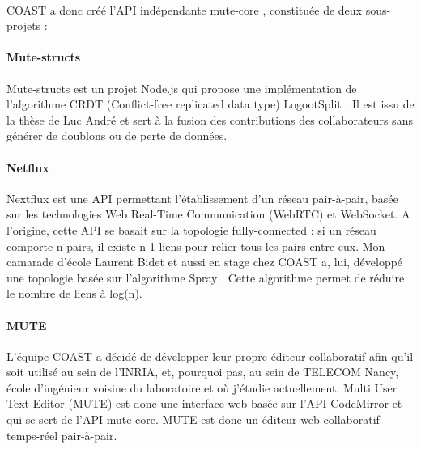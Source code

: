 \documentclass[12pt]{article}
\begin{document}
\paragraph{}
COAST a donc créé l'API indépendante mute-core \cite{mute-core}, constituée de deux sous-projets :

\paragraph{Mute-structs}
Mute-structs \cite{mute-structs} est un projet Node.js qui propose une implémentation de l'algorithme CRDT (Conflict-free replicated data type) LogootSplit \cite{logoot}. Il est issu de la thèse de Luc André et sert à la fusion des contributions des collaborateurs sans générer de doublons ou de perte de données.

\paragraph{Netflux}
Nextflux \cite{netflux} est une API permettant l'établissement d'un réseau pair-à-pair, basée sur les technologies Web Real-Time Communication (WebRTC) et WebSocket. A l'origine, cette API se basait sur la topologie fully-connected \cite{fully} : si un réseau comporte n pairs, il existe n-1 liens pour relier tous les pairs entre eux. Mon camarade d'école Laurent Bidet et aussi en stage chez COAST a, lui, développé une topologie basée sur l'algorithme Spray \cite{spray}. Cette algorithme permet de réduire le nombre de liens à log(n).

\paragraph{MUTE}
L'équipe COAST a décidé de développer leur propre éditeur collaboratif afin qu'il soit utilisé au sein de l'INRIA, et, pourquoi pas, au sein de TELECOM Nancy, école d'ingénieur voisine du laboratoire et où j'étudie actuellement. Multi User Text Editor (MUTE) est donc une interface web basée sur l'API CodeMirror et qui se sert de l'API mute-core. MUTE est donc un éditeur web collaboratif temps-réel pair-à-pair.
\end{document}
